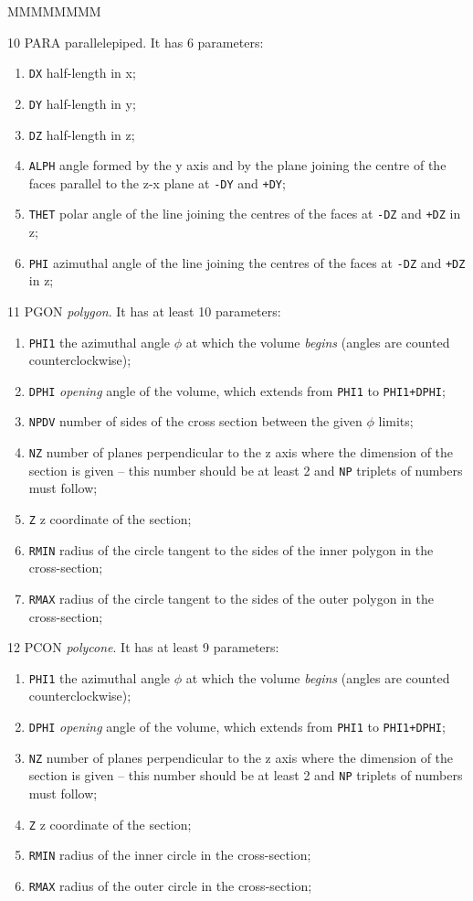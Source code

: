 \begin{DLtt}{MMMMMMMM}
\item[10  PARA] parallelepiped. It has 6 parameters:
\begin{enumerate}
\item {\tt DX} half-length in x;
\item {\tt DY} half-length in y;
\item {\tt DZ} half-length in z;
\item {\tt ALPH} angle formed by the y axis and by the plane joining the
centre of the faces parallel to the z-x plane at {\tt -DY} and {\tt +DY};
\item {\tt THET} polar angle of the line joining the centres of the faces
at {\tt -DZ} and {\tt +DZ} in z;
\item {\tt PHI} azimuthal angle of the line joining the centres of the faces
at {\tt -DZ} and {\tt +DZ} in z;
\end{enumerate}

\item[11  PGON] {\it polygon}. It has at least 10 parameters:
\begin{enumerate}
\item {\tt PHI1} the azimuthal angle $\phi$ at which the volume {\it begins}
(angles are counted counterclockwise);
\item {\tt DPHI} {\it opening} angle of the volume, which extends from
{\tt PHI1} to {\tt PHI1+DPHI};
\item {\tt NPDV} number of sides of the cross section between the
given $\phi$ limits;
\item {\tt NZ} number of planes perpendicular to the z axis where the
dimension of the section is given -- this number should be at least
2 and {\tt NP} triplets of numbers must follow;
\item {\tt Z} z coordinate of the section;
\item {\tt RMIN} radius of the circle tangent to the sides of the inner
polygon in the cross-section;
\item {\tt RMAX} radius of the circle tangent to the sides of the outer
polygon in the cross-section;
\end{enumerate}

\item[12  PCON] {\it polycone}. It has at least 9 parameters:
\begin{enumerate}
\item {\tt PHI1} the azimuthal angle $\phi$ at which the volume {\it begins}
(angles are counted counterclockwise);
\item {\tt DPHI} {\it opening} angle of the volume, which extends from
{\tt PHI1} to {\tt PHI1+DPHI};
\item {\tt NZ} number of planes perpendicular to the z axis where the
dimension of the section is given -- this number should be at least
2 and {\tt NP} triplets of numbers must follow;
\item {\tt Z} z coordinate of the section;
\item {\tt RMIN} radius of the inner circle in the cross-section;
\item {\tt RMAX} radius of the outer circle in the cross-section;
\end{enumerate}


\end{DLtt}
